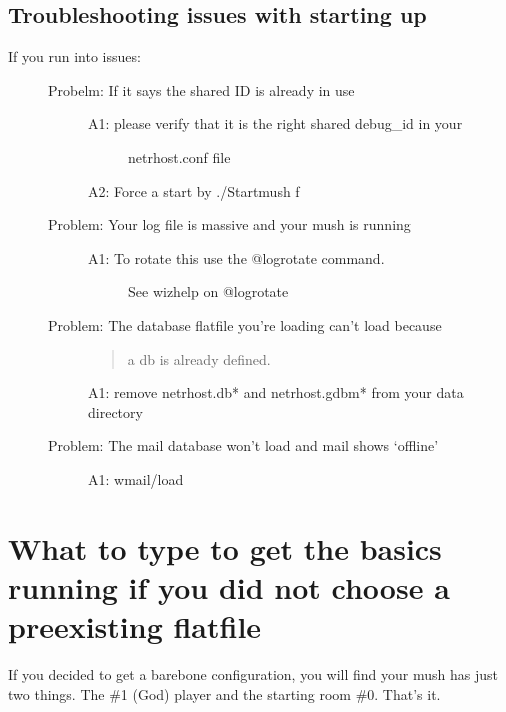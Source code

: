 \documentclass[letterpaper,10pt,english]{sphinxmanual}
\begin{document}
\section{Troubleshooting issues with starting up}
\label{\detokenize{04-configure:troubleshooting-issues-with-starting-up}}\begin{description}
\item[{If you run into issues:}] \leavevmode\begin{description}
\item[{Probelm: If it says the shared ID is already in use}] \leavevmode\begin{description}
\item[{A1: please verify that it is the right shared debug\_id in your}] \leavevmode
\sphinxAtStartPar
netrhost.conf file

\end{description}

\sphinxAtStartPar
A2: Force a start by ./Startmush \sphinxhyphen{}f

\item[{Problem: Your log file is massive and your mush is running}] \leavevmode\begin{description}
\item[{A1: To rotate this use the @logrotate command.}] \leavevmode
\sphinxAtStartPar
See wizhelp on @logrotate

\end{description}

\item[{Problem: The database flatfile you’re loading can’t load because}] \leavevmode\begin{quote}

\sphinxAtStartPar
a db is already defined.
\end{quote}

\sphinxAtStartPar
A1: remove netrhost.db* and netrhost.gdbm* from your data directory

\item[{Problem: The mail database won’t load and mail shows ‘offline’}] \leavevmode
\sphinxAtStartPar
A1: wmail/load

\end{description}

\end{description}


\chapter{What to type to get the basics running if you did not choose a pre\sphinxhyphen{}existing flatfile}
\label{\detokenize{05-newmush:what-to-type-to-get-the-basics-running-if-you-did-not-choose-a-pre-existing-flatfile}}\label{\detokenize{05-newmush::doc}}
\sphinxAtStartPar
If you decided to get a bare\sphinxhyphen{}bone configuration, you will find your mush
has just two things.  The \#1 (God) player and the starting room \#0.  That’s it.
\end{document}
